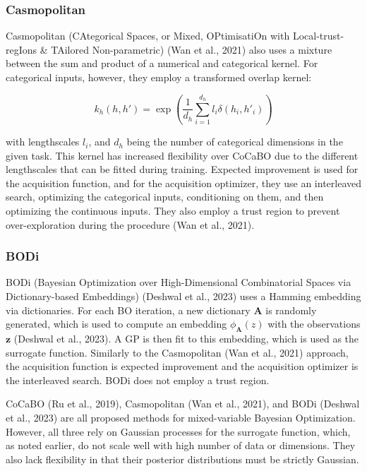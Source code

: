 \documentclass[12pt,twoside]{reedthesis}
\begin{document}
\hypertarget{casmopolitan}{%
\subsubsection{Casmopolitan}\label{casmopolitan}}

Casmopolitan (CAtegorical Spaces, or Mixed, OPtimisatiOn with Local-trust-regIons \& TAilored Non-parametric) (Wan et al., 2021) also uses a mixture between the sum and product of a numerical and categorical kernel. For categorical inputs, however, they employ a transformed overlap kernel:

\[k_h(h,h')=\exp\left(\frac{1}{d_h}\sum_{i=1}^{d_h}l_i\delta(h_i,h'_i)\right)\]

with lengthscales \(l_i\), and \(d_h\) being the number of categorical dimensions in the given task. This kernel has increased flexibility over CoCaBO due to the different lengthscales that can be fitted during training. Expected improvement is used for the acquisition function, and for the acquisition optimizer, they use an interleaved search, optimizing the categorical inputs, conditioning on them, and then optimizing the continuous inputs. They also employ a trust region to prevent over-exploration during the procedure (Wan et al., 2021).

\hypertarget{bodi}{%
\subsubsection{BODi}\label{bodi}}

BODi (Bayesian Optimization over High-Dimensional Combinatorial Spaces via Dictionary-based Embeddings) (Deshwal et al., 2023) uses a Hamming embedding via dictionaries. For each BO iteration, a new dictionary \(\textbf{A}\) is randomly generated, which is used to compute an embedding \(\phi_\textbf{A}(z)\) with the observations \(\textbf{z}\) (Deshwal et al., 2023). A GP is then fit to this embedding, which is used as the surrogate function. Similarly to the Casmopolitan (Wan et al., 2021) approach, the acquisition function is expected improvement and the acquisition optimizer is the interleaved search. BODi does not employ a trust region.

\vspace{\baselineskip}

CoCaBO (Ru et al., 2019), Casmopolitan (Wan et al., 2021), and BODi (Deshwal et al., 2023) are all proposed methods for mixed-variable Bayesian Optimization. However, all three rely on Gaussian processes for the surrogate function, which, as noted earlier, do not scale well with high number of data or dimensions. They also lack flexibility in that their posterior distributions must be strictly Gaussian.
\end{document}
